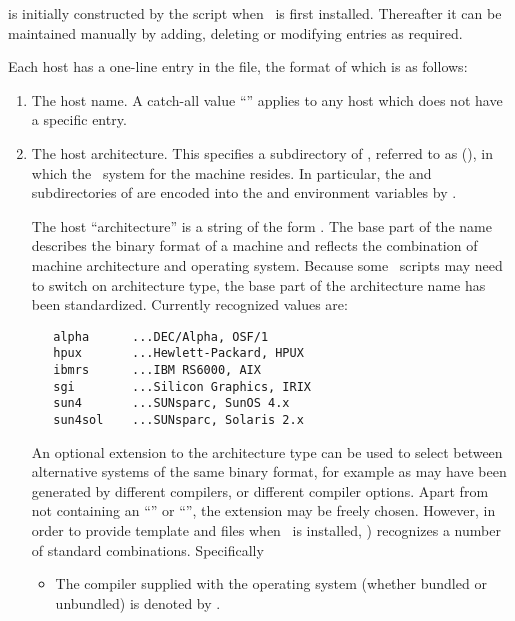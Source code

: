  is initially constructed by the  script
when \aipspp\ is first installed.  Thereafter it can be maintained manually by
adding, deleting or modifying entries as required.

Each host has a one-line entry in the  file, the format of
which is as follows:

\begin{enumerate}
\item
   The host name.  A catch-all value ``'' applies to any host
   which does not have a specific entry.

\item
   The host architecture.  This specifies a subdirectory of ,
   referred to as  (), in which the \aipspp\ 
   system for the machine resides.  In particular, the  and
   \file{doc} subdirectories of \file{\$AIPSARCH} are encoded into the
   \code{PATH} and \code{MANPATH} environment variables by .

   The host ``architecture'' is a string of the form .
   The base part of the name describes the binary format of a machine and
   reflects the combination of machine architecture and operating system.
   Because some \aipspp\ scripts may need to switch on architecture type,
   the base part of the architecture name has been standardized.  Currently
   recognized values are:

\begin{verbatim}
   alpha      ...DEC/Alpha, OSF/1
   hpux       ...Hewlett-Packard, HPUX
   ibmrs      ...IBM RS6000, AIX
   sgi        ...Silicon Graphics, IRIX
   sun4       ...SUNsparc, SunOS 4.x
   sun4sol    ...SUNsparc, Solaris 2.x
\end{verbatim}

   \noindent
   An optional extension to the architecture type can be used to select
   between alternative systems of the same binary format, for example as may
   have been generated by different compilers, or different compiler options.
   Apart from not containing an ``\code{\_}'' or ``\code{:}'', the extension
   may be freely chosen.  However, in order to provide template
    and  files when \aipspp\ is installed,
   \exeref{configure}) recognizes a number of standard combinations.
   Specifically

   \begin{itemize}
   \item
      The compiler supplied with the operating system (whether bundled or
      unbundled) is denoted by \code{ntv}.


\end{itemize}
\end{enumerate}
